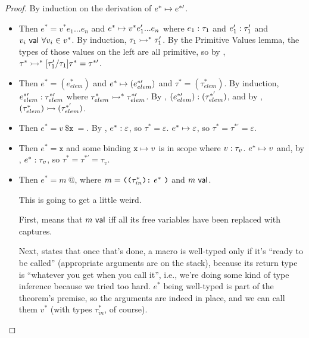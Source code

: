\documentclass[acmsmall, review]{acmart}
\theoremstyle{definition}
\begin{document}
\begin{proof}
By induction on the derivation of $e^* \mapsto e^{*\prime}$.
\begin{itemize}
    \item {}
        Then $e^* = v^* e_1 ... e_n$ and $e^* \mapsto v^* e_1' ... e_n$ where $e_1 : \tau_1$ and $e_1' : \tau_1'$ and $v_i ~\mathsf{val}~ \forall v_i \in v^*$.
        By induction, $\tau_1 \rightarrowtail^* \tau_1'$.
        By the Primitive Values lemma, the types of those values on the left are all primitive, so by , $\tau^* \rightarrowtail^* [\tau_1' / \tau_1]\tau^* = \tau^{*\prime}$.
    
    \item {}
        Then $e^* = (e_{elem}^*)$ and $e^* \mapsto (e_{elem}^{*\prime})$ and $\tau^* = (\tau_{elem}^*)$.
        By induction, $e_{elem}^{*\prime} : \tau_{elem}^{*\prime}$ where $\tau_{elem}^* \rightarrowtail^* \tau_{elem}^{*\prime}$. By , $(e_{elem}^{*\prime}) : (\tau_{elem}^{*'})$, and by , $(\tau_{elem}^*) \rightarrowtail (\tau_{elem}^{*'})$.
        
    \item {}
        Then $e^* = v ~ \texttt{\$x} ~ =$. By , $e^* : \varepsilon$, so $\tau^* = \varepsilon$. $e^* \mapsto \varepsilon$, so $\tau^* = \tau^{*\prime} = \varepsilon$.

    \item {}
        Then $e^* = \texttt{x}$ and some binding $\texttt{x} \mapsto v$ is in scope where $v : \tau_v$. $e^* \mapsto v$ and, by , $e^* : \tau_v$, so $\tau^* = \tau^{*\prime} = \tau_v$.
    
    \item {}
        Then $e^* = m ~\textbf{@}$, where $m = \texttt{((} \tau_{in}^* \texttt{):} ~ e^* ~ \texttt{)}$ and $m ~\mathsf{val}$.

        This is going to get a little weird.
        
        First,  means that $m ~\mathsf{val}$ iff all its free variables have been replaced with captures.
        
        Next,  states that once that's done, a macro is well-typed only if it's ``ready to be called'' (appropriate arguments are on the stack), because its return type is ``whatever you get when you call it'', i.e., we're doing some kind of type inference because we tried too hard.
        $e^*$ being well-typed is part of the theorem's premise, so the arguments are indeed in place, and we can call them $v^*$ (with types $\tau_{in}^*$, of course).
        

\end{itemize}
\end{proof}
\end{document}
